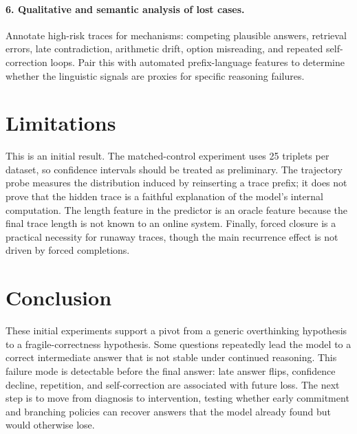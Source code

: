\documentclass[11pt]{article}
\begin{document}
\paragraph{6. Qualitative and semantic analysis of lost cases.}
Annotate high-risk traces for mechanisms: competing plausible answers,
retrieval errors, late contradiction, arithmetic drift, option misreading,
and repeated self-correction loops. Pair this with automated prefix-language
features to determine whether the linguistic signals are proxies for
specific reasoning failures.

\section{Limitations}

This is an initial result. The matched-control experiment uses 25 triplets
per dataset, so confidence intervals should be treated as preliminary. The
trajectory probe measures the distribution induced by reinserting a trace
prefix; it does not prove that the hidden trace is a faithful explanation of
the model's internal computation. The length feature in the predictor is an
oracle feature because the final trace length is not known to an online
system. Finally, forced closure is a practical necessity for runaway traces,
though the main recurrence effect is not driven by forced completions.

\section{Conclusion}

These initial experiments support a pivot from a generic overthinking
hypothesis to a fragile-correctness hypothesis. Some questions repeatedly
lead the model to a correct intermediate answer that is not stable under
continued reasoning. This failure mode is detectable before the final answer:
late answer flips, confidence decline, repetition, and self-correction are
associated with future loss. The next step is to move from diagnosis to
intervention, testing whether early commitment and branching policies can
recover answers that the model already found but would otherwise lose.



\end{document}
